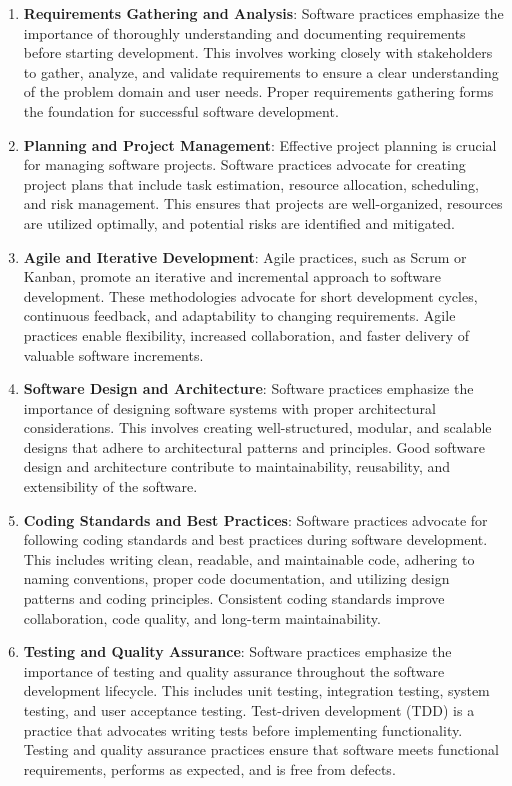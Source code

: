 \begin{enumerate}
    \item \textbf{Requirements Gathering and Analysis}: Software practices emphasize the importance of thoroughly understanding and documenting requirements before starting development. This involves working closely with stakeholders to gather, analyze, and validate requirements to ensure a clear understanding of the problem domain and user needs. Proper requirements gathering forms the foundation for successful software development.

    \item \textbf{Planning and Project Management}: Effective project planning is crucial for managing software projects. Software practices advocate for creating project plans that include task estimation, resource allocation, scheduling, and risk management. This ensures that projects are well-organized, resources are utilized optimally, and potential risks are identified and mitigated.

    \item \textbf{Agile and Iterative Development}: Agile practices, such as Scrum or Kanban, promote an iterative and incremental approach to software development. These methodologies advocate for short development cycles, continuous feedback, and adaptability to changing requirements. Agile practices enable flexibility, increased collaboration, and faster delivery of valuable software increments.

    \item \textbf{Software Design and Architecture}: Software practices emphasize the importance of designing software systems with proper architectural considerations. This involves creating well-structured, modular, and scalable designs that adhere to architectural patterns and principles. Good software design and architecture contribute to maintainability, reusability, and extensibility of the software.

    \item \textbf{Coding Standards and Best Practices}: Software practices advocate for following coding standards and best practices during software development. This includes writing clean, readable, and maintainable code, adhering to naming conventions, proper code documentation, and utilizing design patterns and coding principles. Consistent coding standards improve collaboration, code quality, and long-term maintainability.

    \item \textbf{Testing and Quality Assurance}: Software practices emphasize the importance of testing and quality assurance throughout the software development lifecycle. This includes unit testing, integration testing, system testing, and user acceptance testing. Test-driven development (TDD) is a practice that advocates writing tests before implementing functionality. Testing and quality assurance practices ensure that software meets functional requirements, performs as expected, and is free from defects.


\end{enumerate}
